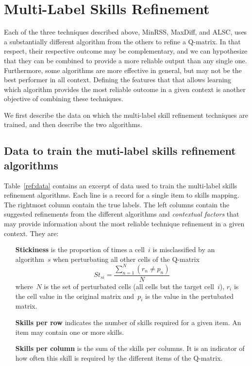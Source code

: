 \documentclass[runningheads,a4paper]{llncs}
\begin{document}
\section{Multi-Label Skills Refinement}\label{sec:MLSR}
Each of the three techniques described above, MinRSS, MaxDiff, and ALSC, uses a substantially different algorithm from the others to refine a Q-matrix. In that respect, their respective outcome may be complementary, and we can hypothesize that they can be combined to provide a more reliable output than any single one. Furthermore, some algorithms are more effective in general, but may not be the best performer in all context.  Defining the features that that allows learning which algorithm provides the most reliable outcome in a given context is another objective of combining these techniques.

We first describe the data on which the multi-label skill refinement techniques are trained, and then describe the two algorithms.

\subsection{Data to train the muti-label skills refinement algorithms}

Table~\ref{ref:data} contains an excerpt of data used to train the multi-label skills refinement algorithms.  Each line is a record for a single item to skills mapping.
The rightmost column contain the true labels. The left columns contain the suggested refinements from the different algorithms and \textit{contextual factors} that may provide information about the most reliable technique
refinement in a given context.  They are: 
\begin{itemize}
\item[\textbf{Stickiness}] is the proportion of times a cell~$i$ is misclassified by an algorithm~$s$ when perturbating all other cells of the Q-matrix
\begin{equation} 
   St_{si} = \frac{\sum_{n=1}^{N}(r_n \neq p_n)}{N}
\end{equation}
where~$N$ is the set of perturbated cells (all cells but the target cell~$i$),
$r_i$ is the cell value in the original matrix and~$p_i$ is the value in the pertubated matrix.

\item[{\textbf{{Skills per row}}}] indicates the number of skills required for a given item. An item may contain one or more skills. 

\item[{\textbf{Skills per column}}] is the sum of the skills per columns. It is an indicator of how often this skill is required by the different items of the Q-matrix. \\
\end{itemize}
\end{document}
